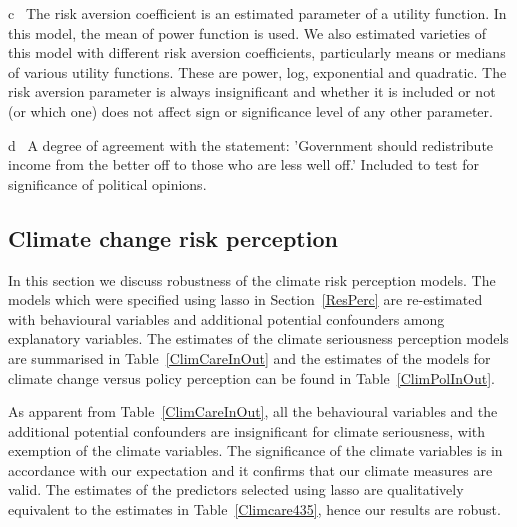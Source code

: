 \documentclass[a4paper,12pt]{article}
\begin{document}
{\begin{threeparttable}
\begin{tablenotes}
\begin{footnotesize}
\begin{adjustwidth}{0.9cm}{}
\item[c]~The risk aversion coefficient is an estimated parameter of a utility function. In this model, the mean of power function is used. We also estimated varieties of this model with different risk aversion coefficients, particularly means or medians of various utility functions. These are power, log, exponential and quadratic. The risk aversion parameter is always insignificant and whether it is included or not (or which one) does not affect sign or significance level of any other parameter.
  \item[d]~A degree of agreement with the statement: 'Government should redistribute income from the better off to those who are less well off.' Included to test for significance of political opinions.
     \end{adjustwidth}    
\singlespacing
  \end{footnotesize}
\end{tablenotes}
  \end{threeparttable} 
\par}


\subsection{Climate change risk perception}\label{RobPerc}

In this section we discuss robustness of the climate risk perception models. The models which were specified using lasso in Section~\ref{ResPerc} are re-estimated with behavioural variables and additional potential confounders among explanatory variables. The estimates of the climate seriousness perception models are summarised in Table~\ref{ClimCareInOut} and the estimates of the models for climate change versus policy perception can be found in Table~\ref{ClimPolInOut}.

As apparent from Table~\ref{ClimCareInOut}, all the behavioural variables and the additional potential confounders are insignificant for climate seriousness, with exemption of the climate variables. The significance of the climate variables is in accordance with our expectation and it confirms that our climate measures are valid. The estimates of the predictors selected using lasso are qualitatively equivalent to the estimates in Table~\ref{Climcare435}, hence our results are robust.
\end{document}
